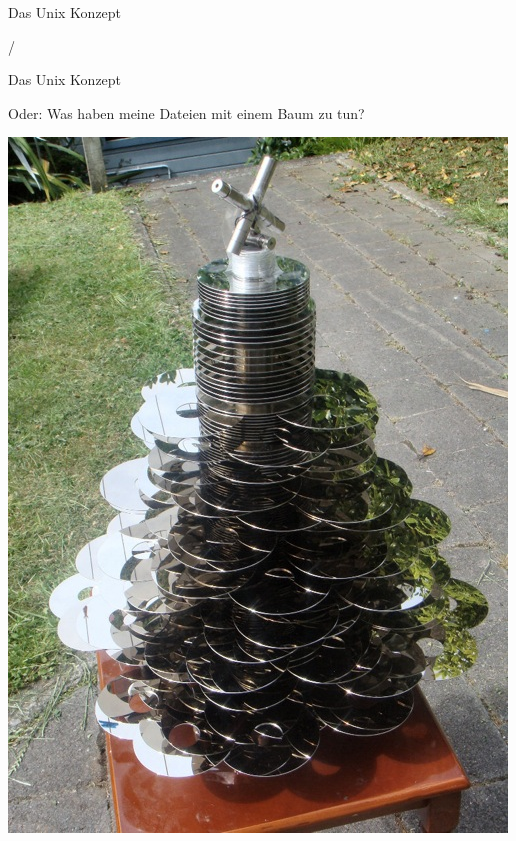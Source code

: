 \begin{frame}{Das Unix Konzept}
\begin{center}
/
\end{center}
\end{frame}

\begin{frame}{Das Unix Konzept}
\begin{center}
Oder: Was haben meine Dateien mit einem Baum zu tun?

\vspace{0.1cm}
\includegraphics[scale=0.2]{img/harddisk-christmas-tree1} 
\end{center}
\end{frame}